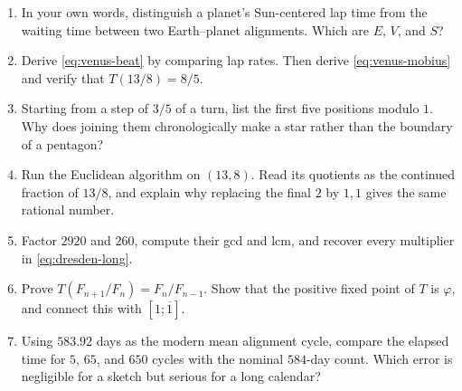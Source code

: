 \begin{exercisebox}
\begin{enumerate}
  \item In your own words, distinguish a planet's Sun-centered lap time from
  the waiting time between two Earth--planet alignments.  Which are $E$, $V$,
  and $S$? 

  \item Derive \eqref{eq:venus-beat} by comparing lap rates.  Then derive
  \eqref{eq:venus-mobius} and verify that $T(13/8)=8/5$.

  \item Starting from a step of $3/5$ of a turn, list the first five positions
  modulo $1$.  Why does joining them chronologically make a star rather than
  the boundary of a pentagon? 

  \item Run the Euclidean algorithm on $(13,8)$.  Read its quotients as the
  continued fraction of $13/8$, and explain why replacing the final $2$ by
  $1,1$ gives the same rational number. 

  \item Factor $2920$ and $260$, compute their gcd and lcm, and recover every
  multiplier in \eqref{eq:dresden-long}. 

  \item Prove $T(F_{n+1}/F_n)=F_n/F_{n-1}$.  Show that the positive fixed point
  of $T$ is $\varphi$, and connect this with $[1;\overline1]$.

  \item Using $583.92$ days as the modern mean alignment cycle, compare the
  elapsed time for $5$, $65$, and $650$ cycles with the nominal $584$-day
  count.  Which error is negligible for a sketch but serious for a long
  calendar? 
\end{enumerate}
\end{exercisebox}
